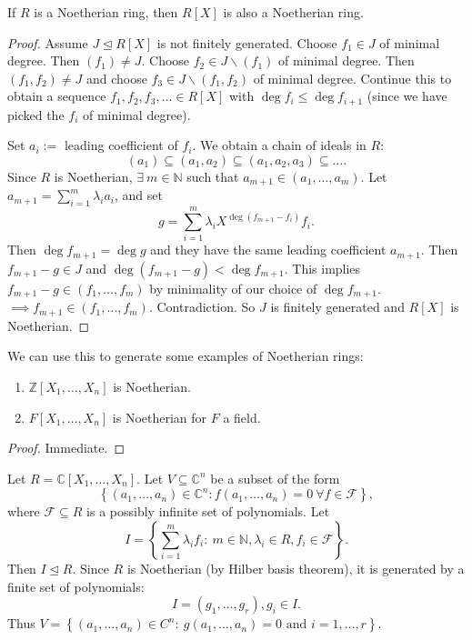 \documentclass[egregdoesnotlikesansseriftitles,a4paper]{scrartcl}
\begin{document}
\begin{theorem}
       If $R $ is a Noetherian ring, then $R[X]$ is also a Noetherian ring.
       \begin{proof}
              Assume $J \unlhd R[X]$ is not finitely generated. Choose $f_1 \in J$ of minimal degree. Then $(f_1 )\neq J$. Choose $f_2 \in J \backslash (f_1 )$ of minimal degree. Then $(f_1 ,f_2 )\neq J$ and choose $f_3 \in J \backslash (f_1 ,f_2 )$ of minimal degree. Continue this to obtain a sequence $f_1 ,f_2 ,f_3 , \ldots \in R[X]$ with $\operatorname{deg}f_{i} \leq \operatorname{deg}f_{i+1}$ (since we have picked the $f_{i}$ of minimal degree). 
              
              Set $a_{i}:=$ leading coefficient of $f_{i }$. We obtain a chain of ideals in $R$: \[
              (a_1 )\subseteq (a_1 ,a_2 )\subseteq (a_1 , a_2 ,a_3 )\subseteq \ldots
              .\] Since $R$ is Noetherian, $\exists \ m \in \mathbb{N}$ such that $a_{m+1}\in (a_1 ,\ldots, a_{m})$. Let $a_{m+1}=\sum_{i=1}^{m }\lambda_{i}a_{i}$, and set \[
              g=\sum_{i=1}^{m}\lambda_{i}X^{\operatorname{deg}(f_{m+1}-f_{i})}f_{i}
              .\] Then $\operatorname{deg}f_{m+1}=\operatorname{deg}g$ and they have the same leading coefficient $a_{m+1}$. Then $f_{m+1}-g \in J$ and $\operatorname{deg}(f_{m+1}-g)< \operatorname{deg}f_{m+1}$. This implies $f_{m+1}-g \in (f_1 , \ldots, f_{m})$ by minimality of our choice of $\operatorname{deg} f_{m+1}$. $\implies f_{m+1 }\in (f_1 , \ldots, f_{m})$. Contradiction. So $J $ is finitely generated and $R[X]$ is Noetherian.
       \end{proof}
\end{theorem}
\begin{corollary}
      We can use this to generate some examples of Noetherian rings:
       \begin{enumerate}
             \item $\mathbb{Z}[X_1 , \ldots , X_n]$ is Noetherian.
             \item $F[X_1 , \ldots , X_n]$ is Noetherian for $F $ a field.
       \end{enumerate}
       \begin{proof}
              Immediate.
       \end{proof}
\end{corollary}
\begin{example*}
      Let $R=\mathbb{C}[X_1 ,\ldots, X_n]$. Let $V \subseteq \mathbb{C}^{n}$ be a subset of the form \[
      \left\{(a_1 ,\ldots, a_n)\in \mathbb{C}^{n}: f (a_1 ,\ldots, a_n)=0 \ \forall f \in \mathcal{F}\right\}
      ,\] where $\mathcal{F} \subseteq R$ is a possibly infinite set of polynomials. Let \[
            I= \left\{\sum_{i=1}^{m}\lambda_{i}f_{i}: \ m \in \mathbb{N}, \lambda_{i}\in R, f_{i}\in \mathcal{F}\right\}
      .\] Then $I \unlhd R$. Since $R $ is Noetherian (by Hilber basis theorem), it is generated by a finite set of polynomials: \[
      I = (g_1 ,\ldots, g_r), g_{i}\in I
      .\] Thus $V=\left\{(a_1 ,\ldots,a_{n})\in C^{n}: \ g (a_1 , \ldots, a_n )=0 \text{ and } i=1,\ldots,r\right\}$.
\end{example*}
\end{document}
